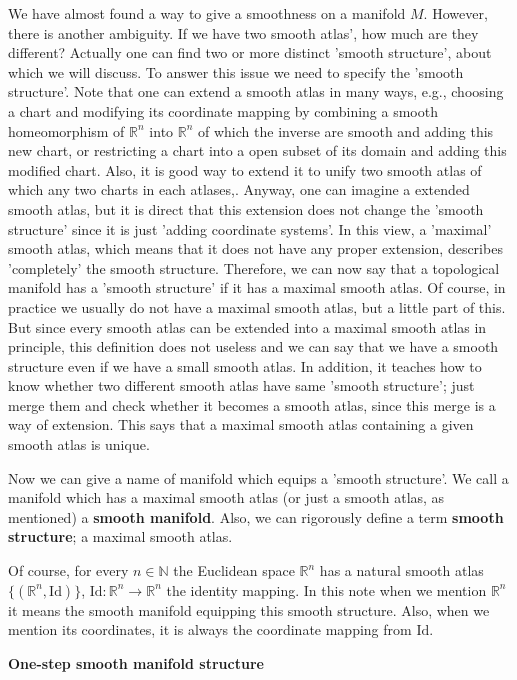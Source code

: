 \documentclass{article}
\newcommand{\NaN}{\mathbb{N}}
\newcommand{\ReR}{\mathbb{R}}
\begin{document}
We have almost found a way to give a smoothness on a manifold $M$.
However, there is another ambiguity.
If we have two smooth atlas', how much are they different?
Actually one can find two or more distinct 'smooth structure', about which we will discuss.
To answer this issue we need to specify the 'smooth structure'.
Note that one can extend a smooth atlas in many ways, e.g., choosing a chart and modifying its coordinate mapping by combining a smooth homeomorphism of $\ReR^n$ into $\ReR^n$ of which the inverse are smooth and adding this new chart, or restricting a chart into a open subset of its domain and adding this modified chart.
Also, it is good way to extend it to unify two smooth atlas of which any two charts in each atlases,.
Anyway, one can imagine a extended smooth atlas, but it is direct that this extension does not change the 'smooth structure' since it is just 'adding coordinate systems'.
In this view, a 'maximal' smooth atlas, which means that it does not have any proper extension, describes 'completely' the smooth structure.
Therefore, we can now say that a topological manifold has a 'smooth structure' if it has a maximal smooth atlas.
Of course, in practice we usually do not have a maximal smooth atlas, but a little part of this.
But since every smooth atlas can be extended into a maximal smooth atlas in principle, this definition does not useless and we can say that we have a smooth structure even if we have a small smooth atlas.
In addition, it teaches how to know whether two different smooth atlas have same 'smooth structure'; just merge them and check whether it becomes a smooth atlas, since this merge is a way of extension.
This says that a maximal smooth atlas containing a given smooth atlas is unique.

Now we can give a name of manifold which equips a 'smooth structure'.
We call a manifold which has a maximal smooth atlas (or just a smooth atlas, as mentioned) a \textbf{smooth manifold}.
Also, we can rigorously define a term \textbf{smooth structure}; a maximal smooth atlas.

Of course, for every $n \in \NaN$ the Euclidean space $\ReR^n$ has a natural smooth atlas $\{(\ReR^n, \textrm{Id})\}$, $\textrm{Id} : \ReR^n \to \ReR^n$ the identity mapping.
In this note when we mention $\ReR^n$ it means the smooth manifold equipping this smooth structure.
Also, when we mention its coordinates, it is always the coordinate mapping from $\textrm{Id}$.

\newpage

\textbf{One-step smooth manifold structure}
\end{document}
